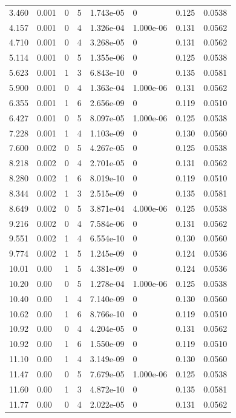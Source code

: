 \documentclass[preview]{standalone}
\begin{document}
{{\begin{tabular}{L{1.2cm}C{1.2cm} C{0.3cm}C{0.5cm} C{1.4cm}C{1.4cm} C{1.4cm}C{1.4cm}}
  3.460  &  0.001  & 0     &  5 &  1.743e-05  & 0  & 0.125 &  0.0538   \\ 
  4.157  &  0.001  & 0     &  4 &  1.326e-04  & 1.000e-06  & 0.131 &  0.0562   \\ 
  4.710  &  0.001  & 0     &  4 &  3.268e-05  & 0  & 0.131 &  0.0562   \\ 
  5.114  &  0.001  & 0     &  5 &  1.355e-06  & 0  & 0.125 &  0.0538   \\ 
  5.623  &  0.001  & 1     &  3 &  6.843e-10  & 0  & 0.135 &  0.0581   \\ 
  5.900  &  0.001  & 0     &  4 &  1.363e-04  & 1.000e-06  & 0.131 &  0.0562   \\ 
  6.355  &  0.001  & 1     &  6 &  2.656e-09  & 0  & 0.119 &  0.0510   \\ 
  6.427  &  0.001  & 0     &  5 &  8.097e-05  & 1.000e-06  & 0.125 &  0.0538   \\ 
  7.228  &  0.001  & 1     &  4 &  1.103e-09  & 0  & 0.130 &  0.0560   \\ 
  7.600  &  0.002  & 0     &  5 &  4.267e-05  & 0  & 0.125 &  0.0538   \\ 
  8.218  &  0.002  & 0     &  4 &  2.701e-05  & 0  & 0.131 &  0.0562   \\ 
  8.280  &  0.002  & 1     &  6 &  8.019e-10  & 0  & 0.119 &  0.0510   \\ 
  8.344  &  0.002  & 1     &  3 &  2.515e-09  & 0  & 0.135 &  0.0581   \\ 
  8.649  &  0.002  & 0     &  5 &  3.871e-04  & 4.000e-06  & 0.125 &  0.0538   \\ 
  9.216  &  0.002  & 0     &  4 &  7.584e-06  & 0  & 0.131 &  0.0562   \\ 
  9.551  &  0.002  & 1     &  4 &  6.554e-10  & 0  & 0.130 &  0.0560   \\ 
  9.774  &  0.002  & 1     &  5 &  1.245e-09  & 0  & 0.124 &  0.0536   \\ 
  10.01  &  0.00  & 1     &  5 &  4.381e-09  & 0  & 0.124 &  0.0536   \\ 
  10.20  &  0.00  & 0     &  5 &  1.278e-04  & 1.000e-06  & 0.125 &  0.0538   \\ 
  10.40  &  0.00  & 1     &  4 &  7.140e-09  & 0  & 0.130 &  0.0560   \\ 
  10.62  &  0.00  & 1     &  6 &  8.766e-10  & 0  & 0.119 &  0.0510   \\ 
  10.92  &  0.00  & 0     &  4 &  4.204e-05  & 0  & 0.131 &  0.0562   \\ 
  10.92  &  0.00  & 1     &  6 &  1.550e-09  & 0  & 0.119 &  0.0510   \\ 
  11.10  &  0.00  & 1     &  4 &  3.149e-09  & 0  & 0.130 &  0.0560   \\ 
  11.47  &  0.00  & 0     &  5 &  7.679e-05  & 1.000e-06  & 0.125 &  0.0538   \\ 
  11.60  &  0.00  & 1     &  3 &  4.872e-10  & 0  & 0.135 &  0.0581   \\ 
  11.77  &  0.00  & 0     &  4 &  2.022e-05  & 0  & 0.131 &  0.0562   \\ 
\hline 
\end{tabular} 

}}
\end{document}
